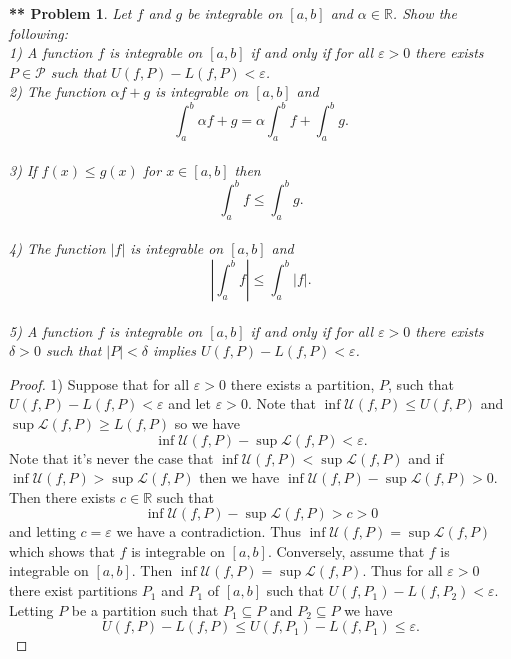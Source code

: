 \documentclass{article}
\newtheorem{**}{** Problem}
\begin{document}
\begin{flushleft}
\begin{**}
Let $f$ and $g$ be integrable on $[a,b]$ and $\alpha \in \mathbb{R}$. Show the following:\\
1) A function $f$ is integrable on $[a,b]$ if and only if for all $\varepsilon > 0$ there exists $P \in \mathcal{P}$ such that $U(f,P) - L(f,P) < \varepsilon$.\\
2) The function $\alpha f + g$ is integrable on $[a,b]$ and
\[
\int_a^b \alpha f + g = \alpha \int_a^b f + \int_a^b g.
\]\\
3) If $f(x) \leq g(x)$ for $x \in [a,b]$ then
\[
\int_a^b f \leq \int_a^b g.
\]\\
4) The function $|f|$ is integrable on $[a,b]$ and
\[
\left | \int_a^b f \right | \leq \int_a^b |f|.
\]\\
5) A function $f$ is integrable on $[a,b]$ if and only if for all $\varepsilon > 0$ there exists $\delta > 0$ such that $|P| < \delta$ implies $U(f,P) - L(f,P) < \varepsilon$.
\end{**}
\begin{proof}
1) Suppose that for all $\varepsilon > 0$ there exists a partition, $P$, such that $U(f,P) - L(f,P) < \varepsilon$ and let $\varepsilon > 0$. Note that $\inf \mathcal{U} (f,P) \leq U(f,P)$ and $\sup \mathcal{L} (f,P) \geq L(f,P)$ so we have
\[
\inf \mathcal{U} (f,P) - \sup \mathcal{L} (f,P) < \varepsilon.
\]
Note that it's never the case that $\inf \mathcal{U} (f,P) < \sup \mathcal{L} (f,P)$ and if $\inf \mathcal{U} (f,P) > \sup \mathcal{L} (f,P)$ then we have $\inf \mathcal{U} (f,P) - \sup \mathcal{L} (f,P) > 0$. Then there exists $c \in \mathbb{R}$ such that
\[
\inf \mathcal{U} (f,P) - \sup \mathcal{L} (f,P) > c > 0
\]
and letting $c = \varepsilon$ we have a contradiction. Thus $\inf \mathcal{U} (f,P) = \sup \mathcal{L} (f,P)$ which shows that $f$ is integrable on $[a,b]$. Conversely, assume that $f$ is integrable on $[a,b]$. Then $\inf \mathcal{U} (f,P) = \sup \mathcal{L} (f,P)$. Thus for all $\varepsilon > 0$ there exist partitions $P_1$ and $P_1$ of $[a,b]$ such that $U(f,P_1) - L(f,P_2) < \varepsilon$. Letting $P$ be a partition such that $P_1 \subseteq P$ and $P_2 \subseteq P$ we have
\[
U(f,P) - L(f,P) \leq U(f,P_1) - L(f,P_1) \leq \varepsilon.
\]\newline


\end{proof}
\end{flushleft}
\end{document}
